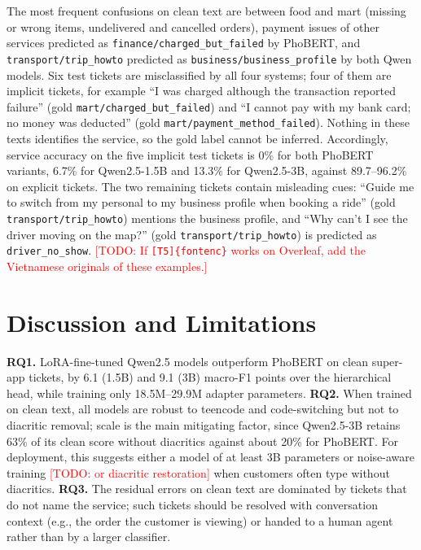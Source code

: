 \documentclass[conference]{IEEEtran}
\newcommand{\TODO}[1]{\textcolor{red}{[TODO: #1]}}
\begin{document}
The most frequent confusions on clean text are between food and mart
(missing or wrong items, undelivered and cancelled orders), payment issues
of other services predicted as \texttt{finance/charged\_but\_failed} by
PhoBERT, and \texttt{transport/trip\_howto} predicted as
\texttt{business/business\_profile} by both Qwen models. Six test tickets
are misclassified by all four systems; four of them are implicit tickets,
for example ``I was charged although the transaction reported failure''
(gold \texttt{mart/charged\_but\_failed}) and ``I cannot pay with my bank
card; no money was deducted'' (gold \texttt{mart/payment\_method\_failed}).
Nothing in these texts identifies the service, so the gold label cannot be
inferred. Accordingly, service accuracy on the five implicit test tickets
is 0\% for both PhoBERT variants, 6.7\% for Qwen2.5-1.5B and 13.3\% for
Qwen2.5-3B, against 89.7--96.2\% on explicit tickets. The two remaining
tickets contain misleading cues: ``Guide me to switch from my personal to
my business profile when booking a ride'' (gold
\texttt{transport/trip\_howto}) mentions the business profile, and ``Why
can't I see the driver moving on the map?'' (gold
\texttt{transport/trip\_howto}) is predicted as \texttt{driver\_no\_show}.
\TODO{If \texttt{[T5]\{fontenc\}} works on Overleaf, add the Vietnamese
originals of these examples.}

\section{Discussion and Limitations}
\label{sec:discussion}

\textbf{RQ1.} LoRA-fine-tuned Qwen2.5 models outperform PhoBERT on clean
super-app tickets, by 6.1 (1.5B) and 9.1 (3B) macro-F1 points over the
hierarchical head, while training only 18.5M--29.9M adapter parameters.
\textbf{RQ2.} When trained on clean text, all models are robust to
teencode and code-switching but not to diacritic removal; scale is the
main mitigating factor, since Qwen2.5-3B retains 63\% of its clean score
without diacritics against about 20\% for PhoBERT. For deployment, this
suggests either a model of at least 3B parameters or noise-aware training
\TODO{or diacritic restoration} when customers often type without
diacritics. \textbf{RQ3.} The residual errors on clean text are dominated by
tickets that do not name the service; such tickets should be resolved with
conversation context (e.g., the order the customer is viewing) or handed
to a human agent rather than by a larger classifier.
\end{document}
